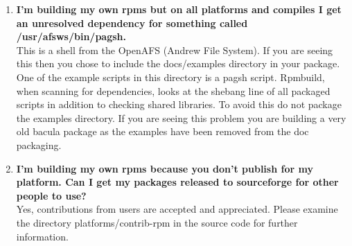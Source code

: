 \begin{enumerate}
\begin{verbatim}
\end{verbatim}
\normalsize

If you are working on a shared system where you can not use the method
above then you need to recreate the appropriate above directory tree with all
of its subdirectories inside your home directory.  Then create a file named

{\tt .rpmmacros} 

in your home directory (or edit  the file if it already exists)
and add the following line:  

\footnotesize
\begin{verbatim}
        %_topdir /home/myuser/redhat
        %_tmppath /tmp
        
\end{verbatim}
\normalsize

It should be noted that Fedora from verion 10 and up is configured to build in
the directory ~/rpmbuild.

Another handy directive for the .rpmmacros file if you wish to suppress the
creation of debug rpm packages is:

\footnotesize
\begin{verbatim}
        %debug_package %{nil}
        
\end{verbatim}

\normalsize

\item 
   \label{faq5}
   {\bf I'm building my own rpms but on all platforms and compiles I get an
   unresolved dependency for something called /usr/afsws/bin/pagsh.} \\
   This is a shell from the OpenAFS (Andrew File System).  If you are
   seeing this then you chose to include the docs/examples directory in
   your package.  One of the example scripts in this directory is a pagsh
   script.  Rpmbuild, when scanning for dependencies, looks at the shebang
   line of all packaged scripts in addition to checking shared libraries.
   To avoid this do not package the examples directory.  If you are seeing
   this problem you are building a very old bacula package as the examples
   have been removed from the doc packaging.

\item 
   \label{faq6}
   {\bf I'm building my own rpms because you don't publish for my platform.
    Can I get my packages released to sourceforge for other people to use?}
    \\
    Yes, contributions from users are accepted and appreciated.  Please
    examine the directory platforms/contrib-rpm in the source code for
    further information.


\end{enumerate}
